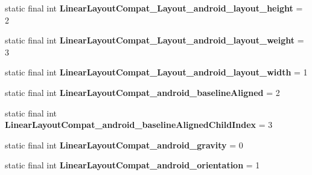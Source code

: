 \begin{DoxyCompactItemize}
\item 
\hypertarget{classandroid_1_1support_1_1v7_1_1appcompat_1_1_r_1_1styleable_acdd283d6d9bf29093b48617cafb4fdbd}{}static final int {\bfseries Linear\+Layout\+Compat\+\_\+\+Layout\+\_\+android\+\_\+layout\+\_\+height} = 2\label{classandroid_1_1support_1_1v7_1_1appcompat_1_1_r_1_1styleable_acdd283d6d9bf29093b48617cafb4fdbd}

\item 
\hypertarget{classandroid_1_1support_1_1v7_1_1appcompat_1_1_r_1_1styleable_a4c9a442a48c1fc614818cd237de9a9a9}{}static final int {\bfseries Linear\+Layout\+Compat\+\_\+\+Layout\+\_\+android\+\_\+layout\+\_\+weight} = 3\label{classandroid_1_1support_1_1v7_1_1appcompat_1_1_r_1_1styleable_a4c9a442a48c1fc614818cd237de9a9a9}

\item 
\hypertarget{classandroid_1_1support_1_1v7_1_1appcompat_1_1_r_1_1styleable_ae18e73da094affbe6cd30ba3ee016462}{}static final int {\bfseries Linear\+Layout\+Compat\+\_\+\+Layout\+\_\+android\+\_\+layout\+\_\+width} = 1\label{classandroid_1_1support_1_1v7_1_1appcompat_1_1_r_1_1styleable_ae18e73da094affbe6cd30ba3ee016462}

\item 
\hypertarget{classandroid_1_1support_1_1v7_1_1appcompat_1_1_r_1_1styleable_a1839a26136f1f9ec79878c1035eebed9}{}static final int {\bfseries Linear\+Layout\+Compat\+\_\+android\+\_\+baseline\+Aligned} = 2\label{classandroid_1_1support_1_1v7_1_1appcompat_1_1_r_1_1styleable_a1839a26136f1f9ec79878c1035eebed9}

\item 
\hypertarget{classandroid_1_1support_1_1v7_1_1appcompat_1_1_r_1_1styleable_a1e2dfafdd5b19904cd76f4e712341057}{}static final int {\bfseries Linear\+Layout\+Compat\+\_\+android\+\_\+baseline\+Aligned\+Child\+Index} = 3\label{classandroid_1_1support_1_1v7_1_1appcompat_1_1_r_1_1styleable_a1e2dfafdd5b19904cd76f4e712341057}

\item 
\hypertarget{classandroid_1_1support_1_1v7_1_1appcompat_1_1_r_1_1styleable_a202f5756f9ea1f3e59f081f08504f7cc}{}static final int {\bfseries Linear\+Layout\+Compat\+\_\+android\+\_\+gravity} = 0\label{classandroid_1_1support_1_1v7_1_1appcompat_1_1_r_1_1styleable_a202f5756f9ea1f3e59f081f08504f7cc}

\item 
\hypertarget{classandroid_1_1support_1_1v7_1_1appcompat_1_1_r_1_1styleable_aa0018fb5f7ace994511fa780754a9bde}{}static final int {\bfseries Linear\+Layout\+Compat\+\_\+android\+\_\+orientation} = 1\label{classandroid_1_1support_1_1v7_1_1appcompat_1_1_r_1_1styleable_aa0018fb5f7ace994511fa780754a9bde}


\end{DoxyCompactItemize}
